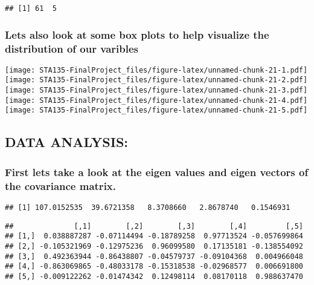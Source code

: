 \documentclass[]{article}
\begin{document}
\begin{verbatim}
## [1] 61  5
\end{verbatim}

\hypertarget{lets-also-look-at-some-box-plots-to-help-visualize-the-distribution-of-our-varibles}{%
\subsubsection{Lets also look at some box plots to help visualize the
distribution of our
varibles}\label{lets-also-look-at-some-box-plots-to-help-visualize-the-distribution-of-our-varibles}}

\texttt{[image: STA135-FinalProject\_files/figure-latex/unnamed-chunk-21-1.pdf]}
\texttt{[image: STA135-FinalProject\_files/figure-latex/unnamed-chunk-21-2.pdf]}
\texttt{[image: STA135-FinalProject\_files/figure-latex/unnamed-chunk-21-3.pdf]}
\texttt{[image: STA135-FinalProject\_files/figure-latex/unnamed-chunk-21-4.pdf]}
\texttt{[image: STA135-FinalProject\_files/figure-latex/unnamed-chunk-21-5.pdf]}

\hypertarget{data-analysis-1}{%
\subsection{DATA ANALYSIS:}\label{data-analysis-1}}

\hypertarget{first-lets-take-a-look-at-the-eigen-values-and-eigen-vectors-of-the-covariance-matrix.}{%
\subsubsection{First lets take a look at the eigen values and eigen
vectors of the covariance
matrix.}\label{first-lets-take-a-look-at-the-eigen-values-and-eigen-vectors-of-the-covariance-matrix.}}

\begin{verbatim}
## [1] 107.0152535  39.6721358   8.3708660   2.8678740   0.1546931
\end{verbatim}

\begin{verbatim}
##              [,1]        [,2]        [,3]        [,4]         [,5]
## [1,]  0.038887287 -0.07114494 -0.18789258  0.97713524 -0.057699864
## [2,] -0.105321969 -0.12975236  0.96099580  0.17135181 -0.138554092
## [3,]  0.492363944 -0.86438807 -0.04579737 -0.09104368  0.004966048
## [4,] -0.863069865 -0.48033178 -0.15318538 -0.02968577  0.006691800
## [5,] -0.009122262 -0.01474342  0.12498114  0.08170118  0.988637470
\end{verbatim}
\end{document}
